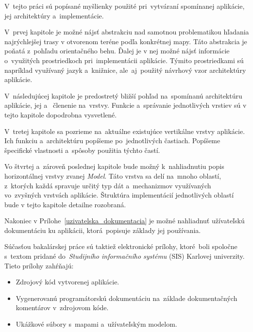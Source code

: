 \bigskip

V~tejto práci sú popísané myšlienky použité pri~vytváraní spomínanej aplikácie, jej architektúry a~implementácie.

V~prvej kapitole je možné nájsť abstrakciu nad samotnou problematikou hľadania najrýchlejšej trasy v otvorenom teréne podľa konkrétnej mapy. Táto abstrakcia je poňatá z~pohľadu orientačného behu. Ďalej je v nej možné nájsť informácie o~využitých prostriedkoch pri~implementácii aplikácie. Týmito prostriedkami sú napríklad využívaný jazyk a~knižnice, ale~aj~použitý návrhový vzor architektúry aplikácie. 

V~následujúcej kapitole je predostretý bližší pohľad na~spomínanú architektúru aplikácie, jej  a~ členenie na~vrstvy. Funkcie a~správanie jednotlivých vrstiev sú v tejto kapitole dopodrobna vysvetlené.

V~tretej kapitole sa pozrieme na~aktuálne existujúce vertikálne vrstvy aplikácie. Ich funkciu a~architektúru popíšeme po~jednotlivých častiach. Popíšeme špecifické vlastnosti a~spôsoby použitia týchto častí. 

Vo štvrtej a~zároveň poslednej kapitole bude možný k~nahliadnutiu popis horizontálnej vrstvy zvanej \textit{Model}. Táto vrstva sa delí na~mnoho oblastí, z~ktorých každá spravuje určitý typ dát a~mechanizmov využívaných vo~zvyšných vrstvách aplikácie. Štruktúra implementácií jednotlivých oblastí bude v tejto kapitole detailne rozobraná.

Nakoniec v Prílohe~\ref{uzivatelska_dokumentacia} je možné nahliadnuť užívateľskú dokumentáciu ku aplikácii, ktorá~popisuje základy jej používania.

Súčasťou bakalárskej práce sú taktiež elektronické prílohy, ktoré~boli spoločne s~textom pridané do~\textit{Studijního informačního systému} (SIS) Karlovej univerzity. Tieto prílohy zahŕňajú:
\begin{itemize}
    \item Zdrojový kód vytvorenej aplikácie.
    \item Vygenerovanú programátorskú dokumentáciu na~základe dokumentačných komentárov v~zdrojovom kóde.
    \item Ukážkové súbory s~mapami a~užívateľským modelom.  
\end{itemize}